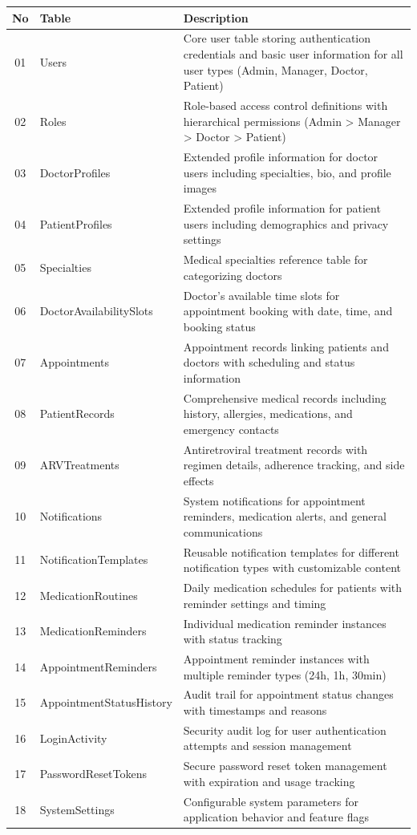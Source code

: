 \documentclass[12pt,a4paper]{article}
\begin{document}
\begin{longtable}{|c|l|p{8cm}|}
\hline
\textbf{No} & \textbf{Table} & \textbf{Description} \\
\hline
01 & Users & Core user table storing authentication credentials and basic user information for all user types (Admin, Manager, Doctor, Patient) \\
\hline
02 & Roles & Role-based access control definitions with hierarchical permissions (Admin > Manager > Doctor > Patient) \\
\hline
03 & DoctorProfiles & Extended profile information for doctor users including specialties, bio, and profile images \\
\hline
04 & PatientProfiles & Extended profile information for patient users including demographics and privacy settings \\
\hline
05 & Specialties & Medical specialties reference table for categorizing doctors \\
\hline
06 & DoctorAvailabilitySlots & Doctor's available time slots for appointment booking with date, time, and booking status \\
\hline
07 & Appointments & Appointment records linking patients and doctors with scheduling and status information \\
\hline
08 & PatientRecords & Comprehensive medical records including history, allergies, medications, and emergency contacts \\
\hline
09 & ARVTreatments & Antiretroviral treatment records with regimen details, adherence tracking, and side effects \\
\hline
10 & Notifications & System notifications for appointment reminders, medication alerts, and general communications \\
\hline
11 & NotificationTemplates & Reusable notification templates for different notification types with customizable content \\
\hline
12 & MedicationRoutines & Daily medication schedules for patients with reminder settings and timing \\
\hline
13 & MedicationReminders & Individual medication reminder instances with status tracking \\
\hline
14 & AppointmentReminders & Appointment reminder instances with multiple reminder types (24h, 1h, 30min) \\
\hline
15 & AppointmentStatusHistory & Audit trail for appointment status changes with timestamps and reasons \\
\hline
16 & LoginActivity & Security audit log for user authentication attempts and session management \\
\hline
17 & PasswordResetTokens & Secure password reset token management with expiration and usage tracking \\
\hline
18 & SystemSettings & Configurable system parameters for application behavior and feature flags \\
\hline
\end{longtable}
\end{document}
